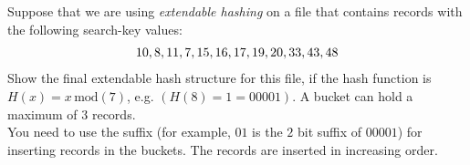


\question[5] Suppose that we are using \textit{extendable hashing} 
on a file that contains records with the following search-key values:
\begin{align}
  10, 8, 11, 7, 15, 16, 17, 19, 20, 33, 43, 48 \nonumber
\end{align}
Show the final extendable hash structure for this file, if the hash 
function is $H(x) = x\,\text{mod}(7)$, e.g. $(H(8) = 1 = 00001)$. A bucket
can hold a maximum of $3$ records. \\
You need to use the suffix (for example, $01$ is the $2$ bit suffix 
of $00001$) for inserting records in the buckets. The records are 
inserted in increasing order.

